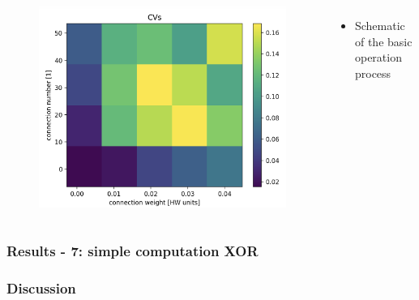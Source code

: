 \documentclass{beamer}
\begin{document}
\begin{frame}
\begin{columns}
          \begin{figure}
    				\centering
    				\includegraphics[width=\linewidth]{figures/CV_sweep.png}
 		   \end{figure}
 		   \begin{itemize}
          		\item Schematic of the basic operation process
          	\end{itemize}
          	
	\end{columns}
    
\end{frame}

\begin{frame}
    \frametitle{Results - 7: simple computation XOR} 
\end{frame}

\begin{frame}
    \frametitle{Discussion}
\end{frame}
\end{document}
